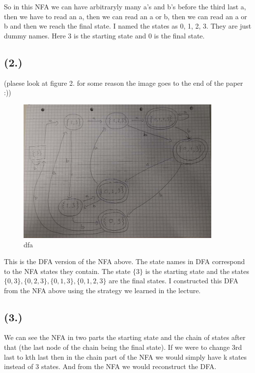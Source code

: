 \documentclass{article}
\begin{document}
So in this NFA we can have arbitraryly many a's and b's before the third last a, then we have to read an a, then we can read an a or b, then we can read an a or b and then we reach the final state.
I named the states as 0, 1, 2, 3. They are just dummy names. Here 3 is the starting state and 0 is the final state.

\subsection*{(2.)}

(plaese look at figure 2. for some reason the image goes to the end of the paper :))
\begin{figure}[h!]
  \centering
  \includegraphics[width=0.9\textwidth]{3_dfa.jpeg}
  \caption{dfa}
\end{figure}
This is the DFA version of the NFA above. The state names in DFA correspond to the NFA states they contain. The state \(\{3\}\) is the starting state
and the states \(\{0, 3\}, \{0,2,3\}, \{0,1,3\}, \{0,1,2,3\}\) are the final states. I constructed this DFA from the NFA above using the strategy we learned in the lecture.

\subsection*{(3.)}

We can see the NFA in two parts the starting state and the chain of states after that (the last node of the chain being the final state). If we were to change 3rd last to kth last
then in the chain part of the NFA we would simply have k states instead of 3 states. And from the NFA we would reconstruct the DFA.
\end{document}
